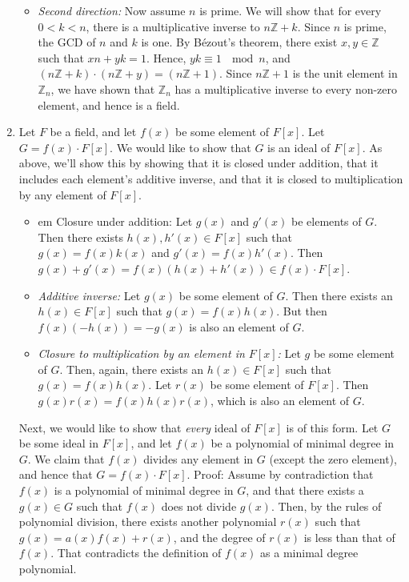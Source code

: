 \documentclass[11pt]{article} \usepackage{amssymb}
\newcommand{\Z}{\mathbb Z} \newcommand{\CalE}{{\mathcal{E}}}
\begin{document}
\begin{enumerate}
\begin{itemize}
    \item{\em Second direction:}
      Now assume $n$ is prime. We will show that for every $0<k<n$, there
      is a multiplicative inverse to $n\Z+k$. Since $n$ is prime, the GCD
      of $n$ and $k$ is one. By B\'ezout's theorem, there exist $x,y\in\Z$
      such that $xn+yk=1$. Hence, $yk\equiv 1\:\mod n$, and 
      $(n\Z+k)\cdot(n\Z+y)=(n\Z+1)$.
      Since $n\Z+1$ is the unit element in $\Z_n$, we have shown that $\Z_n$
      has a multiplicative inverse to every non-zero element, and hence is
      a field.
    \end{itemize}
    \item
    Let $F$ be a field, and let $f(x)$ be some element of $F[x]$. Let
    $G=f(x)\cdot F[x]$. We would like to show that $G$ is an ideal of $F[x]$. As
    above, we'll show this by showing that it is closed under addition,
    that it includes each element's additive inverse, and that it is closed to 
    multiplication by any element of $F[x]$.
    \begin{itemize}
      \item {em Closure under addition:} Let $g(x)$ and
        $g'(x)$ be elements of $G$. Then there exists $h(x),h'(x)\in F[x]$ 
        such that $g(x)=f(x)k(x)$ and $g'(x)=f(x)h'(x)$. Then
        $g(x)+g'(x)=f(x)(h(x)+h'(x))\in f(x)\cdot F[x]$.
      \item {\em Additive inverse:} Let $g(x)$ be some element of $G$. 
        Then there exists an $h(x)\in F[x]$ such that $g(x)=f(x)h(x)$. But then
        $f(x)(-h(x))=-g(x)$ is also an element of $G$.
      \item {\em Closure to multiplication by an element in $F[x]$:} 
        Let $g$ be some element of $G$.
        Then, again, there exists an $h(x)\in F[x]$ such that $g(x)=f(x)h(x)$.
        Let $r(x)$ be some element of $F[x]$. Then $g(x)r(x)=f(x)h(x)r(x)$, 
        which is also an element of $G$.
    \end{itemize}
    
    Next, we would like to show that {\em every} ideal of $F[x]$ is of this
    form. Let $G$ be some ideal in $F[x]$, and let $f(x)$ be a polynomial of 
    minimal degree in $G$. We claim that
    $f(x)$ divides any element in $G$ (except the zero element), and hence that 
    $G=f(x)\cdot F[x]$. Proof: Assume by contradiction that $f(x)$ is a 
    polynomial of minimal degree in $G$, and that there exists a $g(x)\in G$
    such that $f(x)$ does not divide $g(x)$. Then, by the rules of polynomial
    division, there exists another polynomial $r(x)$ such that 
    $g(x)=a(x)f(x)+r(x)$, and the degree of $r(x)$ is less than that of $f(x)$.
    That contradicts the definition of $f(x)$ as a minimal degree polynomial.
    

\end{enumerate}
\end{document}
